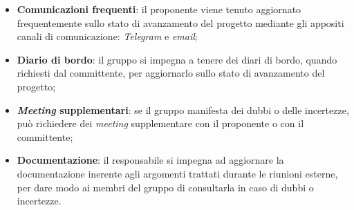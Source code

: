 \begin{itemize}
\begin{itemize}
		      \item \textbf{Comunicazioni frequenti}: il proponente viene tenuto
		            aggiornato frequentemente sullo stato di avanzamento del
		            progetto mediante gli appositi canali di comunicazione:
		            \textit{Telegram} e \textit{email};

		      \item \textbf{Diario di bordo}: il gruppo si impegna a tenere
		            dei diari di
		            bordo, quando richiesti dal committente, per aggiornarlo
		            sullo stato di avanzamento del progetto;

		      \item \textbf{\textit{Meeting} supplementari}: se il gruppo
		            manifesta dei dubbi o delle incertezze, può richiedere dei
		            \textit{meeting} supplementare con il proponente o con il
		            committente;

		      \item \textbf{Documentazione}: il responsabile si impegna ad
		            aggiornare la documentazione inerente agli argomenti
		            trattati durante le riunioni esterne, per dare modo ai
		            membri del gruppo di consultarla in caso di dubbi o
		            incertezze.
	      \end{itemize}
\end{itemize}
